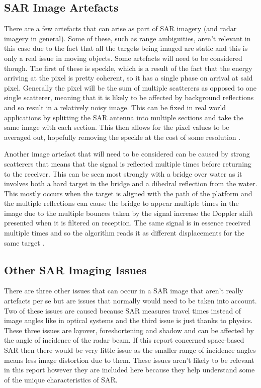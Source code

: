 \subsection{SAR Image Artefacts}
There are a few artefacts that can arise as part of SAR imagery (and radar imagery in general). Some of these, such as range ambiguities, aren't relevant in this case due to the fact that all the targets being imaged are static and this is only a real issue in moving objects. Some artefacts will need to be considered though. The first of these is speckle, which is a result of the fact that the energy arriving at the pixel is pretty coherent, so it has a single phase on arrival at said pixel. Generally the pixel will be the sum of multiple scatterers as opposed to one single scatterer, meaning that it is likely to be affected by background reflections and so result in a relatively noisy image. This can be fixed in real world applications by splitting the SAR antenna into multiple sections and take the same image with each section. This then allows for the pixel values to be averaged out, hopefully removing the speckle at the cost of some resolution \cite{richardsRemoteSensingImaging2009}. \par 
Another image artefact that will need to be considered can be caused by strong scatterers that means that the signal is reflected multiple times before returning to the receiver. This can be seen most strongly with a bridge over water as it involves both a hard target in the bridge and a dihedral reflection from the water. This mostly occurs when the target is aligned with the path of the platform and the multiple reflections can cause the bridge to appear multiple times in the image due to the multiple bounces taken by the signal increase the Doppler shift presented when it is filtered on reception. The same signal is in essence received multiple times and so the algorithm reads it as different displacements for the same target \cite{richardsRemoteSensingImaging2009}. 

\subsection{Other SAR Imaging Issues}
There are three other issues that can occur in a SAR image that aren't really artefacts per se but are issues that normally would need to be taken into account. Two of these issues are caused because SAR measures travel times instead of image angles like in optical systems and the third issue is just thanks to physics. These three issues are layover, foreshortening and shadow and can be affected by the angle of incidence of the radar beam. If this report concerned space-based SAR then there would be very little issue as the smaller range of incidence angles means less image distortion due to them. These issues aren't likely to be relevant in this report however they are included here because they help understand some of the unique characteristics of SAR.
